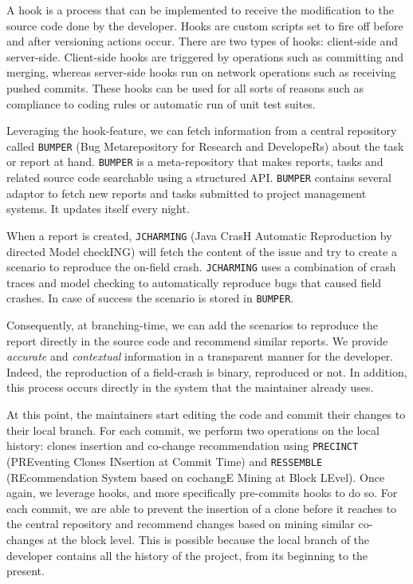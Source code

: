 A hook is a process that can be implemented to receive the  modification to the source code done by the developer.
Hooks are custom scripts set to fire off before and after versioning actions occur.
There are two types of hooks: client-side and server-side.
Client-side hooks are triggered by operations such as committing and merging, whereas server-side hooks run on network operations such as receiving pushed commits.
These hooks can be used for all sorts of reasons such as compliance to coding rules or automatic run of unit test suites.

Leveraging the hook-feature, we can fetch information from a central repository called {\tt BUMPER} (Bug Metarepository for Research and DevelopeRs) about the task or report at hand.
{\tt BUMPER} is a meta-repository that makes reports, tasks and related source code searchable using a structured API.
{\tt BUMPER} contains several adaptor to fetch new reports and tasks submitted to project management systems.
It updates itself every night.

When a report is created, {\tt JCHARMING} (Java CrasH Automatic Reproduction by directed Model checkING) will fetch the content of the issue and try to create a scenario to reproduce the on-field crash.
{\tt JCHARMING} uses a combination of crash traces and model
checking to automatically reproduce bugs that caused field crashes.
In case of success the scenario is stored in {\tt BUMPER}.

Consequently, at branching-time, we can add the scenarios to reproduce the report directly in the source code and recommend similar reports.
We provide {\it accurate} and {\it contextual} information in a transparent manner for the developer.
Indeed, the reproduction of a field-crash is binary, reproduced or not.
In addition, this process occurs directly in the  system that the maintainer already uses.

At this point, the maintainers start editing the code and commit their changes to their local branch.
For each commit, we perform two operations on the local history: clones insertion and co-change recommendation using {\tt PRECINCT} (PREventing Clones INsertion at Commit Time) and {\tt RESSEMBLE} (REcommendation System based on cochangE Mining at Block LEvel).
Once again, we leverage hooks, and more specifically pre-commits hooks to do so.
For each commit, we are able to prevent the insertion of a clone before it reaches to the central repository and recommend changes based on mining similar co-changes at the block level.
This is possible because the local branch of the developer contains all the history of the project, from its beginning to the present.

